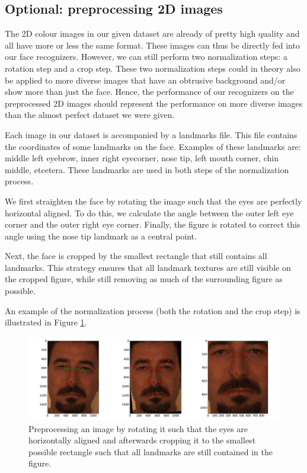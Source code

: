 \documentclass[]{article}
\begin{document}
\subsection{Optional: preprocessing 2D images}
The 2D colour images in our given dataset are already of pretty high quality and all have more or less the same format. These images can thus be directly fed into our face recognizers. However, we can still perform two normalization steps: a rotation step and a crop step. These two normalization steps could in theory also be applied to more diverse images that have an obtrusive background and/or show more than just the face. Hence, the performance of our recognizers on the preprocessed 2D images should represent the performance on more diverse images than the almost perfect dataset we were given.

Each image in our dataset is accompanied by a landmarks file. This file contains the coordinates of some landmarks on the face. Examples of these landmarks are: middle left eyebrow, inner right eyecorner, nose tip, left mouth corner, chin middle, etcetera. These landmarks are used in both steps of the normalization process.

We first straighten the face by rotating the image such that the eyes are perfectly horizontal aligned. To do this, we calculate the angle between the outer left eye corner and the outer right eye corner. Finally, the figure is rotated to correct this angle using the nose tip landmark as a central point.

Next, the face is cropped by the smallest rectangle that still contains all landmarks. This strategy ensures that all landmark textures are still visible on the cropped figure, while still removing as much of the surrounding figure as possible.

An example of the normalization process (both the rotation and the crop step) is illustrated in Figure \ref{fig:preprocess}.

\begin{figure}
	\centering
	\includegraphics[width=\textwidth]{preprocess2D.pdf}
	\caption{Preprocessing an image by rotating it such that the eyes are horizontally aligned and afterwards cropping it to the smallest possible rectangle such that all landmarks are still contained in the figure.}
	\label{fig:preprocess}
\end{figure}
\end{document}
